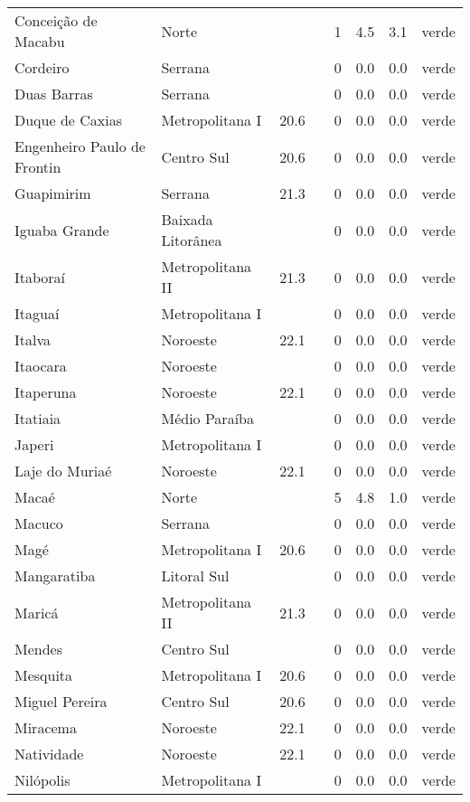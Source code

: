 \begin{longtable}{l|lllllll}
  Conceição de Macabu & Norte &  &  & 1 & 4.5 & 3.1 & verde \\ 
  Cordeiro & Serrana &  &  & 0 & 0.0 & 0.0 & verde \\ 
  Duas Barras & Serrana &  &  & 0 & 0.0 & 0.0 & verde \\ 
  Duque de Caxias & Metropolitana I & 20.6 &  & 0 & 0.0 & 0.0 & verde \\ 
  Engenheiro Paulo de Frontin & Centro Sul & 20.6 &  & 0 & 0.0 & 0.0 & verde \\ 
  Guapimirim & Serrana & 21.3 &  & 0 & 0.0 & 0.0 & verde \\ 
  Iguaba Grande & Baixada Litorânea &  &  & 0 & 0.0 & 0.0 & verde \\ 
  Itaboraí & Metropolitana II & 21.3 &  & 0 & 0.0 & 0.0 & verde \\ 
  Itaguaí & Metropolitana I &  &  & 0 & 0.0 & 0.0 & verde \\ 
  Italva & Noroeste & 22.1 &  & 0 & 0.0 & 0.0 & verde \\ 
  Itaocara & Noroeste &  &  & 0 & 0.0 & 0.0 & verde \\ 
  Itaperuna & Noroeste & 22.1 &  & 0 & 0.0 & 0.0 & verde \\ 
  Itatiaia & Médio Paraíba &  &  & 0 & 0.0 & 0.0 & verde \\ 
  Japeri & Metropolitana I &  &  & 0 & 0.0 & 0.0 & verde \\ 
  Laje do Muriaé & Noroeste & 22.1 &  & 0 & 0.0 & 0.0 & verde \\ 
  Macaé & Norte &  &  & 5 & 4.8 & 1.0 & verde \\ 
  Macuco & Serrana &  &  & 0 & 0.0 & 0.0 & verde \\ 
  Magé & Metropolitana I & 20.6 &  & 0 & 0.0 & 0.0 & verde \\ 
  Mangaratiba & Litoral Sul &  &  & 0 & 0.0 & 0.0 & verde \\ 
  Maricá & Metropolitana II & 21.3 &  & 0 & 0.0 & 0.0 & verde \\ 
  Mendes & Centro Sul &  &  & 0 & 0.0 & 0.0 & verde \\ 
  Mesquita & Metropolitana I & 20.6 &  & 0 & 0.0 & 0.0 & verde \\ 
  Miguel Pereira & Centro Sul & 20.6 &  & 0 & 0.0 & 0.0 & verde \\ 
  Miracema & Noroeste & 22.1 &  & 0 & 0.0 & 0.0 & verde \\ 
  Natividade & Noroeste & 22.1 &  & 0 & 0.0 & 0.0 & verde \\ 
  Nilópolis & Metropolitana I &  &  & 0 & 0.0 & 0.0 & verde \\ 

\end{longtable}
